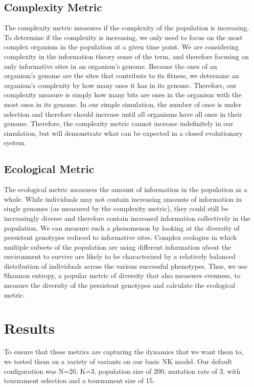 \documentclass[letterpaper]{article}
\begin{document}
\subsection{Complexity Metric}
    The complexity metric measures if the complexity of the population is increasing. To determine if the complexity is increasing, we only need to focus on the most complex organism in the population at a given time point. We are considering complexity in the information theory sense of the term, and therefore focusing on only informative sites in an organism’s genome. Because the ones of an organism’s genome are the sites that contribute to its fitness, we determine an organism’s complexity by how many ones it has in its genome. Therefore, our complexity measure is simply how many bits are ones in the organism with the most ones in its genome. In our simple simulation, the number of ones is under selection and therefore should increase until all organisms have all ones in their genome. Therefore, the complexity metric cannot increase indefinitely in our simulation, but will demonstrate what can be expected in a closed evolutionary system.

\subsection{Ecological Metric}
    The ecological metric measures the amount of information in the population as a whole. While individuals may not contain increasing amounts of information in single genomes (as measured by the complexity metric), they could still be increasingly diverse and therefore contain increased information collectively in the population. We can measure such a phenomenon by looking at the diversity of persistent genotypes reduced to informative sites. Complex ecologies in which multiple subsets of the population are using different information about the environment to survive are likely to be characterized by a relatively balanced distribution of individuals across the various successful phenotypes. Thus, we use Shannon entropy, a popular metric of diversity that also measures evenness, to measure the diversity of the persistent genotypes and calculate the ecological metric.



\section{Results}
    To ensure that these metrics are capturing the dynamics that we want them to, we tested them on a variety of variants on our basic NK model. Our default configuration was N=20, K=3, population size of 200, mutation rate of 3, with tournament selection and a tournament size of 15.
\end{document}
